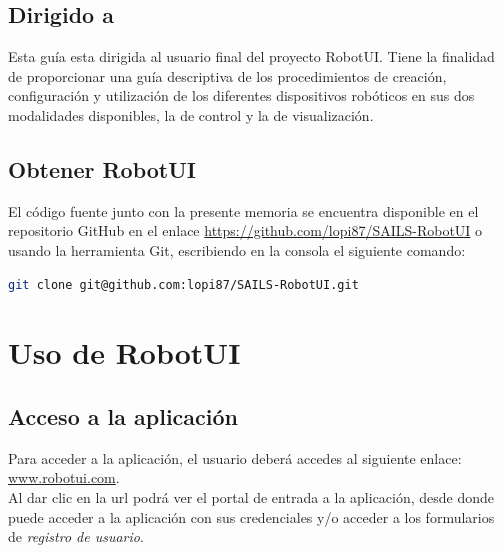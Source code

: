 \subsection{Dirigido a}

Esta guía esta dirigida al usuario final del proyecto RobotUI. Tiene la finalidad de proporcionar una guía descriptiva de los procedimientos de creación, configuración y utilización de los diferentes dispositivos 
robóticos en sus dos modalidades disponibles, la de control y la de visualización.

\subsection{Obtener RobotUI}

El código fuente junto con la presente memoria se encuentra disponible en el repositorio GitHub en el enlace \url{https://github.com/lopi87/SAILS-RobotUI} o usando la herramienta
Git, escribiendo en la consola el siguiente comando:\\

\begin{lstlisting}[language=bash]
 git clone git@github.com:lopi87/SAILS-RobotUI.git 
\end{lstlisting}


\section{ Uso de RobotUI }
\label{sec:uso-robotui}


\subsection{ Acceso a la aplicación }
\label{sec:acceso-aplicacion}

Para acceder a la aplicación, el usuario deberá accedes al siguiente enlace: \url{www.robotui.com}. \\

Al dar clic en la url podrá ver el portal de entrada a la aplicación, desde donde puede acceder a la aplicación con sus credenciales y/o  acceder a los formularios de \emph{registro de usuario}.


